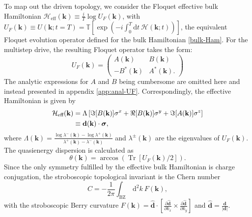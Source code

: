 \documentclass[aps,prb,twocolumn,superscriptaddress,groupedaddress]{revtex4}
\DeclareMathOperator{\Tr}{Tr}
\begin{document}
To map out the driven topology, we consider the Floquet effective bulk Hamiltonian $\mathcal{H}_{\text{eff}} (\mathbf{k}) \equiv \frac{i}{T} \log U_F(\mathbf{k})$, with $U_F(\mathbf{k}) \equiv U(\mathbf{k} ; t=T) = \mathbb{T} \left[ \exp \left( -i \int_0^T \mathrm{d} t \: \mathcal{H}(\mathbf{k}; t) \right) \right]$, the equivalent Floquet  evolution operator defined for the bulk Hamiltonian \eqref{bulk-Ham}.
For the multistep drive, the resulting Floquet operator takes the form:
%
\begin{equation}
U_F(\mathbf{k}) = \left( \begin{array}{cc}
A(\mathbf{k}) & B(\mathbf{k}) \\
-B^*(\mathbf{k}) & A^*(\mathbf{k}).
\end{array}
\right)
\end{equation}
%
The analytic expressions for $A$ and $B$ being cumbersome are omitted here and instead presented in appendix \ref{app:anal-UF}.
Correspondingly, the effective Hamiltonian is given by 
%
\begin{align}
{\tiny
\mathcal{H}_{\text{eff}}(\mathbf{k}) } &= {\tiny \Lambda \left[ \Im[B(\mathbf{k})] \sigma^x + \Re[B(\mathbf{k})] \sigma^y + \Im[A(\mathbf{k})] \sigma^z \right]} \nonumber \\
&\equiv \mathbf{d}(\mathbf{k}) \cdot \boldsymbol{\sigma},
\label{Heff_strobo}
\end{align}
%
where $\Lambda(\mathbf{k}) =  \frac{\log \lambda^-(\mathbf{k}) - \log \lambda^+(\mathbf{k}) }{\lambda^+(\mathbf{k})  - \lambda^-(\mathbf{k}) }$ and $\lambda^{\pm}(\mathbf{k}) $ are the eigenvalues of $U_F(\mathbf{k})$.
The quasienergy dispersion is calculated as~\cite{Molignini:2019, Molignini:2020-multifrequency}
%
\begin{equation}
\theta(\mathbf{k}) = \arccos \left( \Tr[ U_F(\mathbf{k})/2] \right).
\label{eq:quasienergy-disp}
\end{equation}
%
Since the only symmetry fulfilled by the effective bulk Hamiltonian is charge conjugation, the stroboscopic topological invariant is the Chern number~\cite{ChiuReview:2016,vonGersdorff:2021}
%
\begin{equation}
C = -\frac{1}{2\pi} \int_{\text{BZ}} \: \mathrm{d}^2 k \: F(\mathbf{k}),
\label{top-inv-strobo}
\end{equation}
%
with the stroboscopic Berry curvature $F(\mathbf{k}) =  \hat{\mathbf{d}} \cdot \left[ \frac{\partial \hat{\mathbf{d}}}{\partial  k_x} \times \frac{\partial \hat{\mathbf{d}}}{\partial  k_y} \right]$ and $\hat{\mathbf{d}}= \frac{\mathbf{d}}{|\mathbf{d}|}$.
\end{document}
